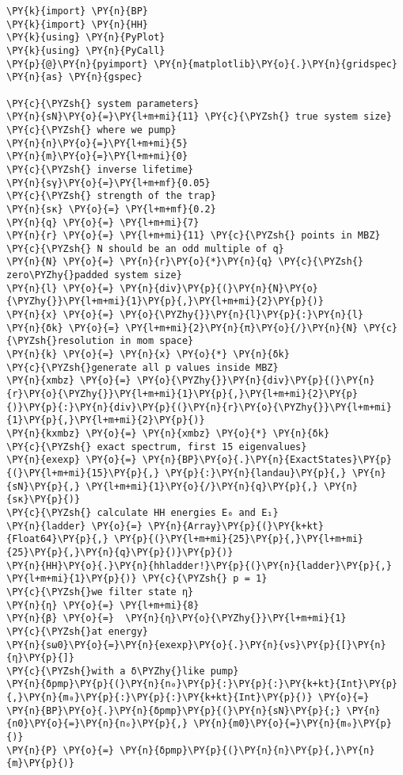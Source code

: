 \begin{Verbatim}[commandchars=\\\{\}]
\PY{k}{import} \PY{n}{BP}
\PY{k}{import} \PY{n}{HH}
\PY{k}{using} \PY{n}{PyPlot}
\PY{k}{using} \PY{n}{PyCall}
\PY{p}{@}\PY{n}{pyimport} \PY{n}{matplotlib}\PY{o}{.}\PY{n}{gridspec} \PY{n}{as} \PY{n}{gspec}

\PY{c}{\PYZsh{} system parameters}
\PY{n}{sN}\PY{o}{=}\PY{l+m+mi}{11} \PY{c}{\PYZsh{} true system size}
\PY{c}{\PYZsh{} where we pump}
\PY{n}{n}\PY{o}{=}\PY{l+m+mi}{5}
\PY{n}{m}\PY{o}{=}\PY{l+m+mi}{0}
\PY{c}{\PYZsh{} inverse lifetime}
\PY{n}{sγ}\PY{o}{=}\PY{l+m+mf}{0.05}
\PY{c}{\PYZsh{} strength of the trap}
\PY{n}{sκ} \PY{o}{=} \PY{l+m+mf}{0.2}
\PY{n}{q} \PY{o}{=} \PY{l+m+mi}{7}
\PY{n}{r} \PY{o}{=} \PY{l+m+mi}{11} \PY{c}{\PYZsh{} points in MBZ}
\PY{c}{\PYZsh{} N should be an odd multiple of q}
\PY{n}{N} \PY{o}{=} \PY{n}{r}\PY{o}{*}\PY{n}{q} \PY{c}{\PYZsh{} zero\PYZhy{}padded system size}
\PY{n}{l} \PY{o}{=} \PY{n}{div}\PY{p}{(}\PY{n}{N}\PY{o}{\PYZhy{}}\PY{l+m+mi}{1}\PY{p}{,}\PY{l+m+mi}{2}\PY{p}{)}
\PY{n}{x} \PY{o}{=} \PY{o}{\PYZhy{}}\PY{n}{l}\PY{p}{:}\PY{n}{l}
\PY{n}{δk} \PY{o}{=} \PY{l+m+mi}{2}\PY{n}{π}\PY{o}{/}\PY{n}{N} \PY{c}{\PYZsh{}resolution in mom space}
\PY{n}{k} \PY{o}{=} \PY{n}{x} \PY{o}{*} \PY{n}{δk}
\PY{c}{\PYZsh{}generate all p values inside MBZ}
\PY{n}{xmbz} \PY{o}{=} \PY{o}{\PYZhy{}}\PY{n}{div}\PY{p}{(}\PY{n}{r}\PY{o}{\PYZhy{}}\PY{l+m+mi}{1}\PY{p}{,}\PY{l+m+mi}{2}\PY{p}{)}\PY{p}{:}\PY{n}{div}\PY{p}{(}\PY{n}{r}\PY{o}{\PYZhy{}}\PY{l+m+mi}{1}\PY{p}{,}\PY{l+m+mi}{2}\PY{p}{)}
\PY{n}{kxmbz} \PY{o}{=} \PY{n}{xmbz} \PY{o}{*} \PY{n}{δk}
\PY{c}{\PYZsh{} exact spectrum, first 15 eigenvalues}
\PY{n}{exexp} \PY{o}{=} \PY{n}{BP}\PY{o}{.}\PY{n}{ExactStates}\PY{p}{(}\PY{l+m+mi}{15}\PY{p}{,} \PY{p}{:}\PY{n}{landau}\PY{p}{,} \PY{n}{sN}\PY{p}{,} \PY{l+m+mi}{1}\PY{o}{/}\PY{n}{q}\PY{p}{,} \PY{n}{sκ}\PY{p}{)}
\PY{c}{\PYZsh{} calculate HH energies E₀ and E₁}
\PY{n}{ladder} \PY{o}{=} \PY{n}{Array}\PY{p}{(}\PY{k+kt}{Float64}\PY{p}{,} \PY{p}{(}\PY{l+m+mi}{25}\PY{p}{,}\PY{l+m+mi}{25}\PY{p}{,}\PY{n}{q}\PY{p}{)}\PY{p}{)}
\PY{n}{HH}\PY{o}{.}\PY{n}{hhladder!}\PY{p}{(}\PY{n}{ladder}\PY{p}{,} \PY{l+m+mi}{1}\PY{p}{)} \PY{c}{\PYZsh{} p = 1}
\PY{c}{\PYZsh{}we filter state η}
\PY{n}{η} \PY{o}{=} \PY{l+m+mi}{8}
\PY{n}{β} \PY{o}{=}  \PY{n}{η}\PY{o}{\PYZhy{}}\PY{l+m+mi}{1}
\PY{c}{\PYZsh{}at energy}
\PY{n}{sω0}\PY{o}{=}\PY{n}{exexp}\PY{o}{.}\PY{n}{νs}\PY{p}{[}\PY{n}{η}\PY{p}{]}
\PY{c}{\PYZsh{}with a δ\PYZhy{}like pump}
\PY{n}{δpmp}\PY{p}{(}\PY{n}{n₀}\PY{p}{:}\PY{p}{:}\PY{k+kt}{Int}\PY{p}{,}\PY{n}{m₀}\PY{p}{:}\PY{p}{:}\PY{k+kt}{Int}\PY{p}{)} \PY{o}{=} \PY{n}{BP}\PY{o}{.}\PY{n}{δpmp}\PY{p}{(}\PY{n}{sN}\PY{p}{;} \PY{n}{n0}\PY{o}{=}\PY{n}{n₀}\PY{p}{,} \PY{n}{m0}\PY{o}{=}\PY{n}{m₀}\PY{p}{)}
\PY{n}{P} \PY{o}{=} \PY{n}{δpmp}\PY{p}{(}\PY{n}{n}\PY{p}{,}\PY{n}{m}\PY{p}{)}


\end{Verbatim}
